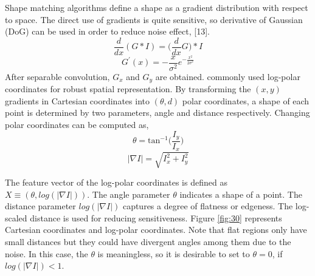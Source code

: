 \documentclass[conference]{IEEEtran}
\begin{document}
Shape matching algorithms define a shape as a gradient distribution with respect to space. The direct use of gradients is quite sensitive, so derivative of Gaussian (DoG) can be used in order to reduce noise effect, [13].
\begin{equation}\label{eq:30}
  \frac{d}{dx}(G*I) = \Big( \frac{d}{dx}G \Big) * I
\end{equation}
\begin{equation}\label{eq:40}
  G^{\prime}(x) = - \frac{x}{ \sigma ^2} e^{ - \frac{x^2}{2\sigma ^2}}
\end{equation}
After separable convolution, \begin{math} G_x \end{math} and \begin{math} G_y \end{math} are obtained. \cite{Mikolajczyk, Belongie} commonly used log-polar coordinates for robust spatial representation. By transforming the \begin{math} (x, y) \end{math} gradients in Cartesian coordinates into \begin{math} (\theta, d) \end{math} polar coordinates, a shape of each point is determined by two parameters, angle and distance respectively. Changing polar coordinates can be computed as,
\begin{equation}\label{eq:50}
  \theta = \textrm{tan}^{-1} \Big( \frac{I_y}{I_x} \Big)
\end{equation}
\begin{equation}\label{eq:60}
  |\nabla I| = \sqrt{I_x^2 + I_y^2 }
\end{equation}

The feature vector of the log-polar coordinates is defined as \begin{math} X \equiv ( \theta, log(|\nabla I|) ) \end{math}. The angle parameter \begin{math} \theta \end{math} indicates a shape of a point. The distance parameter \begin{math} log(|\nabla I|) \end{math} captures a degree of flatness or edgeness. The log-scaled distance is used for reducing sensitiveness. Figure \ref{fig:30} represents Cartesian coordinates and log-polar coordinates. Note that flat regions only have small distances but they could have divergent angles among them due to the noise. In this case, the \begin{math} \theta \end{math} is meaningless, so it is desirable to set to \begin{math} \theta = 0 \end{math}, if \begin{math} log(|\nabla I|) < 1 \end{math}. 
\end{document}
